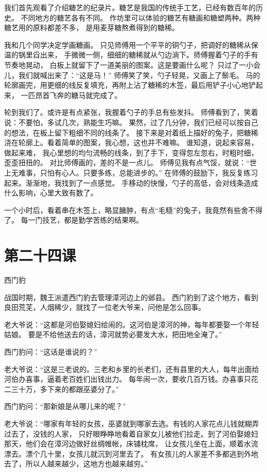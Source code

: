 \documentclass[12pt,UTF8]{ctexbook}
\begin{document}
我们首先观看了介绍糖艺的纪录片。糖艺是我国的传统手工艺，已经有数百年的历史。
不同地方的糖艺各有不同。
作坊里可以体验的糖艺有糖画和糖塑两种。两种糖艺用的原料都差不多，
是用麦芽糖熬煮得到的糖稀。

我和几个同学决定学画糖画。
只见师傅用一个平平的铜勺子，把调好的糖稀从保温的锅里舀出来，
手微微一侧，细细的糖稀就从勺边淌下。师傅握着勺子的手有节奏地晃动，
白板上就留下了一道美丽的图案。这是要画什么呢？
只过了一小会儿，我们就喊出来了：“这是马！”
师傅笑了笑，勺子轻晃，又画上了鬃毛。
马的轮廓画完，用更细的线反复填充，再附上沾了糖稀的木签，最后用铲子小心地铲起来，
一匹昂首飞奔的糖马就完成了。

轮到我们了。或许是有点紧张，我握着勺子的手总有些发抖。
师傅看到了，笑着说：不要怕，多试几次，熟能生巧嘛。
果然，过了几分钟，我们已经可以按自己的想法，在板上留下粗细不同的线条了。
接下来是对着纸上描好的兔子，把糖稀浇在轮廓上。看着简单的图案，我心想，这也并不难嘛。
谁知道，说起来容易，做起来难，
我心里想的均匀流畅的线条，到了手下，变得忽左忽右，时粗时细，歪歪扭扭的。
对比师傅画的，差的不是一点儿。
师傅见我有点气馁，就说：“世上无难事，只怕有心人。只要多练，总能进步的。”
在师傅的鼓励下，我反复练习起来。渐渐地，我找到了一点感觉。
手移动的快慢，勺子的高低，会对线条造成什么影响，心里大致有数了。

一个小时后，看着串在木签上，略显臃肿，有点“毛糙”的兔子，我竟然有些舍不得了。
每一门技艺，都是勤学苦练的结果啊。

\section{第二十四课}

西门豹

战国时期，魏王派遣西门豹去管理漳河边上的邺县。
西门豹到了这个地方，看到良田荒芜，人烟稀少，就找了一位老大爷来，问他是怎么回事。

老大爷说：“这都是河伯娶媳妇给闹的。这河伯是漳河的神，每年都要娶一个年轻姑娘。
要是不给他送去的话，漳河就势必要发大水，把田地全淹了。”

西门豹问：“这话是谁说的？”

老大爷说：“这是三老说的。三老和乡里的长老们，还有县里的大人，每年出面给河伯办喜事，逼着老百姓们出钱出力。
每年闹一次，要收几百万钱。办喜事只花二三十万，多下来的都跟巫婆分了。”

西门豹问：“那新娘是从哪儿来的呢？”

老大爷说：“哪家有年轻的女孩，巫婆就到哪家去选。有钱的人家花点儿钱就糊弄过去了，没钱的人家，
只好眼睁睁地看着自家女儿被他们拉走。到了河伯娶媳妇那天，他们会在漳河边做好丝绸帷帐，床铺枕席，
让女孩儿坐在上面，顺着水流漂去。漂个几十里，女孩儿就沉到河里去了。
有女孩儿的人家差不多都逃到外地去了，所以人越来越少，这地方也越来越穷。” 
\end{document}
